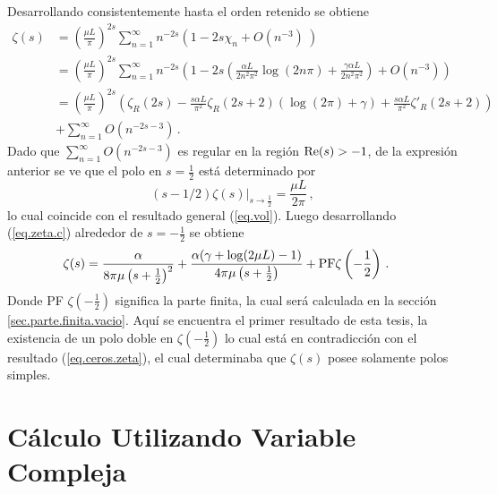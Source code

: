 Desarrollando consistentemente hasta el orden retenido se obtiene
\begin{align}\label{eq.zeta.c}
    \zeta  (s) &= \left( \frac{\mu L}{\pi} \right) ^{2 s}
    \sum _{n=1} ^{\infty} 
    n ^{-2s}
    \left(
    1 - 2 s \chi _n + O \left( n ^{-3} \right) \
    \right)   \nonumber \\[5pt]
     &= \left( \frac{\mu L }{\pi} \right) ^{2 s}
    \sum _{n=1} ^{\infty} n ^{-2 s} 
    \left(
    1 - 2s \left(
    \frac{\alpha L }{2 n ^2 \pi ^2} \log ( 2  n \pi) + 
    \frac{\gamma \alpha L }{2 n ^2 \pi ^2} 
	\right) +
    O \left( n ^{-3}   \right)
    \right) \nonumber \\[5pt]
    &=   \left( \frac{\mu L }{ \pi } \right) ^{2 s}  
    \left( \zeta _R (2 s) -
	\frac{ s \alpha L}{ \pi ^2} \zeta _R (2s+2)
	\left(
	    \log (2  \pi ) + \gamma
	\right) + 
    \frac{s \alpha L}{\pi ^2}
	\zeta ' _R(2s+2) \right) \nonumber \\[5pt]
	& + \sum _{n=1} ^{\infty} O \left( n ^{-2s-3} \right) \, .
\end{align}    
Dado que $\sum _{n=1} ^{\infty} O \left( n ^{-2s-3} \right)$ es regular en la región  ${\rm Re }(s) > -1$, de la expresión anterior se ve que el polo en $s=  \frac{1}{2}$ está determinado por
\begin{equation}\label{eq.res.2}
    ( s-1/2 ) \zeta  (s) | _{s \rightarrow \frac{1}{2}} = 
    \frac{\mu L }{2 \pi}
    	\, ,
\end{equation}
lo cual coincide con el resultado general (\ref{eq.vol}). Luego desarrollando (\ref{eq.zeta.c}) alrededor de $s=-\frac{1}{2}$ se obtiene
\begin{align}\label{eq.res.1}
    &\zeta  (s) =  \frac{\alpha}{8  \pi \mu \left(s+\frac{1}{2} \right)^2} +
    \frac{ \alpha ( \gamma  +  \log (2\mu L ) -1 ) }
    	{4  \pi \mu \left(s+\frac{1}{2} \right) }  + 
	{\rm PF }\zeta \left(- \frac{1}{2} \right)
    	\, .
\end{align}
Donde PF $\zeta \left(- \frac{1}{2} \right)$ significa la parte finita, la cual será calculada en la sección \ref{sec.parte.finita.vacio}.
Aquí se encuentra el primer resultado de esta tesis, la existencia de un polo doble en $\zeta \left( -\frac{1}{2} \right)$ lo cual está en contradicción con el resultado (\ref{eq.ceros.zeta}), el cual determinaba que $\zeta (s)$ posee solamente polos simples.

\section{Cálculo Utilizando Variable Compleja}\label{seq.2.com}


